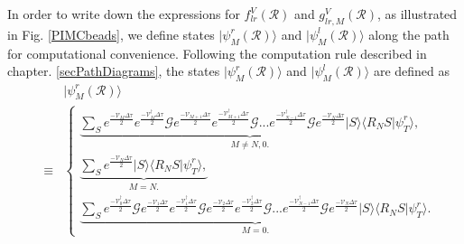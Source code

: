 \documentclass[12pt,letterpaper,UTF8]{report}
\begin{document}
In order to write down the expressions for $f^V_{lr}(\mathcal{R})$ and $g^V_{lr,M}(\mathcal{R})$, as illustrated in Fig. \ref{PIMCbeads}, we define states $| \psi^r_M (\mathcal{R}) \rangle $ and $| \psi^l_M (\mathcal{R})\rangle$ along the path for computational convenience.
Following the computation rule described in chapter. \ref{secPathDiagrams},
the states $| \psi^r_M (\mathcal{R}) \rangle $ and $| \psi^l_M (\mathcal{R})\rangle$ are defined as
\begin{eqnarray}
&& | \psi^r_M (\mathcal{R}) \rangle \nonumber \\
&  \!\!\!\! \! \equiv & \! \!\!
\begin{cases}
\underbrace{  \sum\limits_{S}
   e^{\frac{- \mathcal{V}_M  \Delta \tau }{2}}  e^{\frac{- \mathcal{V}^\dagger_M  \Delta \tau }{2}} \bm{\mathcal{G}}
e^{\frac{- \mathcal{V}_{M\!+\!1}  \Delta \tau }{2}}  e^{\frac{- \mathcal{V}^\dagger_{M\!+1\!}  \Delta \tau }{2}} \bm{\mathcal{G}}
...
e^{\frac{- \mathcal{V}^\dagger_{N\!-\!1}  \Delta \tau }{2}} \bm{\mathcal{G}}
e^{\frac{- \mathcal{V}_N  \Delta \tau }{2}}
| S \rangle \langle R_N  S | \psi^r_T \rangle,
}_{ M \neq  N,  0.} \\
\underbrace{ \sum\limits_{S}
e^{\frac{- \mathcal{V}_N  \Delta \tau }{2}}
| S \rangle \langle R_N  S | \psi^r_T \rangle,
}_{M = N.} \\
\underbrace{  \sum\limits_{S} \! e^{\frac{- \mathcal{V}^\dagger_0  \Delta \tau }{2}} \bm{\mathcal{G}}
   e^{\frac{- \mathcal{V}_1  \Delta \tau }{2}}  e^{\frac{- \mathcal{V}^\dagger_1  \Delta \tau }{2}} \bm{\mathcal{G}}
e^{\frac{- \mathcal{V}_{2}  \Delta \tau }{2}}  e^{\frac{- \mathcal{V}^\dagger_{2}  \Delta \tau }{2}} \bm{\mathcal{G}}
 ...
e^{\frac{- \mathcal{V}^\dagger_{N\!-\!1}  \Delta \tau }{2}} \bm{\mathcal{G}}
e^{\frac{- \mathcal{V}_N  \Delta \tau }{2}}
| S \rangle \langle R_N  S | \psi^r_T \rangle.
}_{M =0.}
\end{cases} \label{psirmRdef}
\end{eqnarray}
\end{document}

